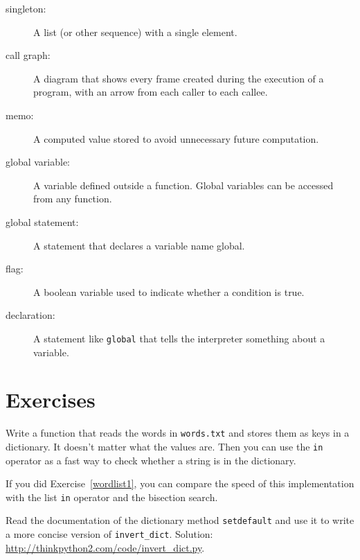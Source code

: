 \documentclass[10pt]{book}
\begin{document}
\begin{description}
\item[singleton:] A list (or other sequence) with a single element.

\item[call graph:] A diagram that shows every frame created during
the execution of a program, with an arrow from each caller to
each callee. 

\item[memo:] A computed value stored to avoid unnecessary future 
computation.

\item[global variable:]  A variable defined outside a function.  Global
variables can be accessed from any function.

\item[global statement:]  A statement that declares a variable name
global.

\item[flag:] A boolean variable used to indicate whether a condition
is true.

\item[declaration:] A statement like {\tt global} that tells the
interpreter something about a variable.

\end{description}


\section{Exercises}

\begin{exercise}
\label{wordlist2}

Write a function that reads the words in {\tt words.txt} and
stores them as keys in a dictionary.  It doesn't matter what the
values are.  Then you can use the {\tt in} operator
as a fast way to check whether a string is in
the dictionary.

If you did Exercise~\ref{wordlist1}, you can compare the speed
of this implementation with the list {\tt in} operator and the
bisection search.

\end{exercise}


\begin{exercise}
\label{setdefault}

Read the documentation of the dictionary method {\tt setdefault}
and use it to write a more concise version of \verb"invert_dict".
Solution: \url{http://thinkpython2.com/code/invert_dict.py}.

\end{exercise}
\end{document}
